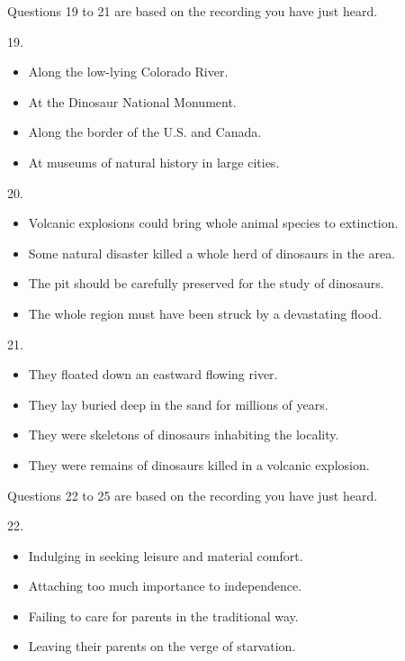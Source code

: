 \documentclass[UTF8,11pt]{ctexart}
\begin{document}
Questions 19 to 21 are based on the recording you have just heard.


19.


\begin{itemize}[leftmargin=2em,itemsep=.2em,topsep=.4em]\item[A.] Along the low-lying Colorado River.
\item[B.] At the Dinosaur National Monument.
\item[C.] Along the border of the U.S. and Canada.
\item[D.] At museums of natural history in large cities.
\end{itemize}

20.


\begin{itemize}[leftmargin=2em,itemsep=.2em,topsep=.4em]\item[A.] Volcanic explosions could bring whole animal species to extinction.
\item[B.] Some natural disaster killed a whole herd of dinosaurs in the area.
\item[C.] The pit should be carefully preserved for the study of dinosaurs.
\item[D.] The whole region must have been struck by a devastating flood.
\end{itemize}

21.


\begin{itemize}[leftmargin=2em,itemsep=.2em,topsep=.4em]\item[A.] They floated down an eastward flowing river.
\item[B.] They lay buried deep in the sand for millions of years.
\item[C.] They were skeletons of dinosaurs inhabiting the locality.
\item[D.] They were remains of dinosaurs killed in a volcanic explosion.
\end{itemize}

Questions 22 to 25 are based on the recording you have just heard.


22.


\begin{itemize}[leftmargin=2em,itemsep=.2em,topsep=.4em]\item[A.] Indulging in seeking leisure and material comfort.
\item[B.] Attaching too much importance to independence.
\item[C.] Failing to care for parents in the traditional way.
\item[D.] Leaving their parents on the verge of starvation.
\end{itemize}
\end{document}
